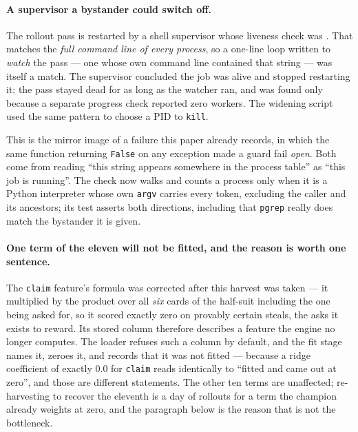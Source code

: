 \documentclass[11pt,a4paper]{article}
\begin{document}
\paragraph{A supervisor a bystander could switch off.} The rollout pass is
restarted by a shell supervisor whose liveness check was
. That matches the
\emph{full command line of every process}, so a one-line loop written to
\emph{watch} the pass --- one whose own command line contained that string ---
was itself a match. The supervisor concluded the job was alive and stopped
restarting it; the pass stayed dead for as long as the watcher ran, and was
found only because a separate progress check reported zero workers. The
widening script used the same pattern to choose a PID to \texttt{kill}.

This is the mirror image of a failure this paper already records, in which the
same function returning \texttt{False} on any exception made a guard fail
\emph{open}. Both come from reading ``this string appears somewhere in the
process table'' as ``this job is running''. The check now walks
 and counts a process only when it is a Python interpreter whose
own \texttt{argv} carries every token, excluding the caller and its ancestors;
its test asserts both directions, including that \texttt{pgrep} really does
match the bystander it is given.

\paragraph{One term of the eleven will not be fitted, and the reason is worth
one sentence.} The \texttt{claim} feature's formula was corrected after this
harvest was taken --- it multiplied by the product over all \emph{six} cards of
the half-suit including the one being asked for, so it scored exactly zero on
provably certain steals, the asks it exists to reward. Its stored column
therefore describes a feature the engine no longer computes. The loader refuses
such a column by default, and the fit stage names it, zeroes it, and records
that it was not fitted --- because a ridge coefficient of exactly $0.0$ for
\texttt{claim} reads identically to ``fitted and came out at zero'', and those
are different statements. The other ten terms are unaffected; re-harvesting to
recover the eleventh is a day of rollouts for a term the champion already
weights at zero, and the paragraph below is the reason that is not the
bottleneck.
\end{document}
